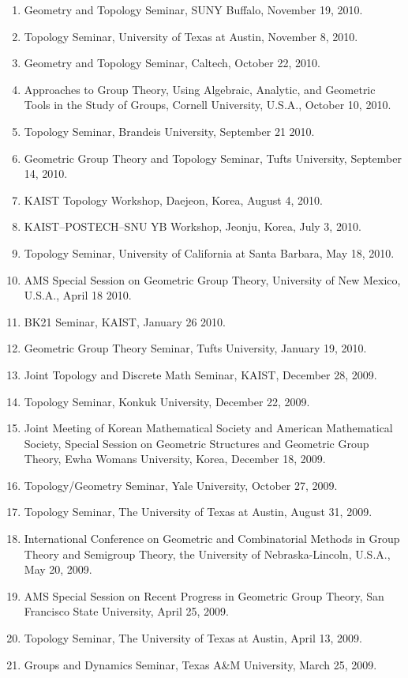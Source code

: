 \documentclass[11pt,a4paper]{article}
\begin{document}
\begin{enumerate}[leftmargin=1.5em, label=\arabic*.]
\item Geometry and Topology Seminar, SUNY Buffalo, November 19, 2010.
\item Topology Seminar, University of Texas at Austin, November 8, 2010.
\item Geometry and Topology Seminar, Caltech, October 22, 2010.
\item Approaches to Group Theory, Using Algebraic, Analytic, and Geometric Tools in the Study of Groups, Cornell University, U.S.A., October 10, 2010.
\item Topology Seminar, Brandeis University, September 21 2010.
\item Geometric Group Theory and Topology Seminar, Tufts University, September 14, 2010.
\item KAIST Topology Workshop, Daejeon, Korea, August 4, 2010.
\item KAIST--POSTECH--SNU YB Workshop, Jeonju, Korea, July 3, 2010.
\item Topology Seminar, University of California at Santa Barbara, May 18, 2010.
\item AMS Special Session on Geometric Group Theory, University of New Mexico, U.S.A., April 18 2010.
\item BK21 Seminar, KAIST, January 26 2010.
\item Geometric Group Theory Seminar, Tufts University, January 19, 2010.
\item Joint Topology and Discrete Math Seminar, KAIST, December 28, 2009.
\item Topology Seminar, Konkuk University, December 22, 2009.
\item Joint Meeting of Korean Mathematical Society and American Mathematical Society, Special Session on Geometric Structures and Geometric Group Theory, Ewha Womans University, Korea, December 18, 2009.
\item Topology/Geometry Seminar, Yale University, October 27, 2009.
\item Topology Seminar, The University of Texas at Austin, August 31, 2009.
\item International Conference on Geometric and Combinatorial Methods in Group Theory and Semigroup Theory, the University of Nebraska-Lincoln, U.S.A., May 20, 2009.
\item AMS Special Session on Recent Progress in Geometric Group Theory, San Francisco State University, April 25, 2009.
\item Topology Seminar, The University of Texas at Austin, April 13, 2009.
\item Groups and Dynamics Seminar, Texas A\&M University, March 25, 2009.

\end{enumerate}
\end{document}
